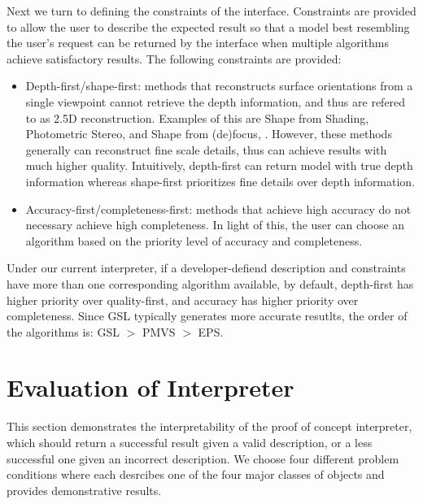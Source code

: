 Next we turn to defining the constraints of the interface. Constraints are provided to allow the user to describe the expected result so that a model best resembling the user's request can be returned by the interface when multiple algorithms achieve satisfactory results. The following constraints are provided: 
\begin{itemize}
\item Depth-first/shape-first: methods that reconstructs surface orientations from a single viewpoint cannot retrieve the depth information, and thus are refered to as 2.5D reconstruction. Examples of this are Shape from Shading, Photometric Stereo, and Shape from (de)focus, \etc. However, these methods generally can reconstruct fine scale details, thus can achieve results with much higher quality. Intuitively, depth-first can return model with true depth information whereas shape-first prioritizes fine details over depth information.
\item Accuracy-first/completeness-first: methods that achieve high accuracy do not necessary achieve high completeness. In light of this, the user can choose an algorithm based on the priority level of accuracy and completeness.
\end{itemize}

Under our current interpreter, if a developer-defiend description and constraints have more than one corresponding algorithm available, by default, depth-first has higher priority over quality-first, and accuracy has higher priority over completeness. Since GSL typically generates more accurate resutlts, the order of the algorithms is: GSL $>$ PMVS $>$ EPS.

\section{Evaluation of Interpreter}
\label{sec:eval_interp}
This section demonstrates the interpretability of the proof of concept interpreter, which should return a successful result given a valid description, or a less successful one given an incorrect description. We choose four different problem conditions where each desrcibes one of the four major classes of objects and provides demonstrative results.

